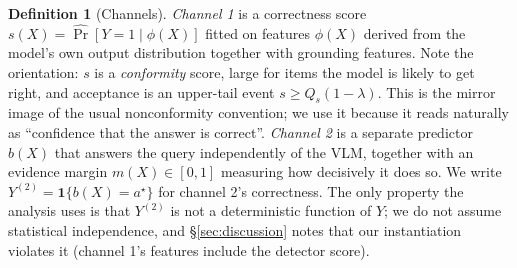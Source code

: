 \documentclass{article}
\theoremstyle{plain}
\theoremstyle{definition}
\newtheorem{definition}{Definition}
\theoremstyle{remark}
\begin{document}
\begin{definition}[Channels]
\label{def:channels}
\emph{Channel 1} is a correctness score $s(X)=\widehat{\Pr}[Y=1\mid\phi(X)]$ fitted on
features $\phi(X)$ derived from the model's own output distribution together with grounding
features. Note the orientation: $s$ is a \emph{conformity} score, large for items the model
is likely to get right, and acceptance is an upper-tail event $s\ge Q_s(1-\lambda)$. This is
the mirror image of the usual nonconformity convention; we use it because it reads naturally
as ``confidence that the answer is correct''. \emph{Channel 2} is a separate predictor $b(X)$ that answers the query
independently of the VLM, together with an evidence margin $m(X)\in[0,1]$ measuring how
decisively it does so. We write $Y^{(2)}=\mathbf{1}\{b(X)=a^\star\}$ for channel 2's
correctness. The only property the analysis uses is that $Y^{(2)}$ is not a deterministic
function of $Y$; we do not assume statistical independence, and \S\ref{sec:discussion}
notes that our instantiation violates it (channel 1's features include the detector score).
\end{definition}
\end{document}
